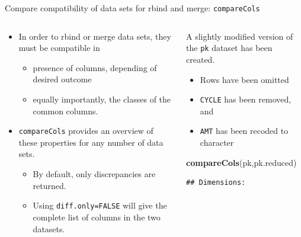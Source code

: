 \documentclass[
  8pt,
  ignorenonframetext,
  aspectratio=169]{beamer}
\newenvironment{Shaded}{\begin{snugshade}}{\end{snugshade}}
\newcommand{\KeywordTok}[1]{\textcolor[rgb]{0.13,0.29,0.53}{\textbf{#1}}}
\newcommand{\NormalTok}[1]{#1}
\providecommand{\tightlist}{%
  \setlength{\itemsep}{0pt}\setlength{\parskip}{0pt}}
\begin{document}
\begin{frame}[fragile]{Compare compatibility of data sets for rbind and
merge: \texttt{compareCols}}
\protect\hypertarget{compare-compatibility-of-data-sets-for-rbind-and-merge-comparecols}{}
\begin{columns}[T]
\begin{column}{0.48\textwidth}
\begin{itemize}
\tightlist
\item
  In order to rbind or merge data sets, they must be compatible in

  \begin{itemize}
  \tightlist
  \item
    presence of columns, depending of desired outcome
  \item
    equally importantly, the classes of the common columns.
  \end{itemize}
\item
  \texttt{compareCols} provides an overview of these properties for any
  number of data sets.

  \begin{itemize}
  \tightlist
  \item
    By default, only discrepancies are returned.
  \item
    Using \texttt{diff.only=FALSE} will give the complete list of
    columns in the two datasets.
  \end{itemize}
\end{itemize}
\end{column}

\begin{column}{0.48\textwidth}
A slightly modified version of the \texttt{pk} dataset has been created.

\begin{itemize}
\tightlist
\item
  Rows have been omitted
\item
  \texttt{CYCLE} has been removed, and
\item
  \texttt{AMT} has been recoded to character
\end{itemize}

\begin{Shaded}
\begin{Highlighting}[]
\KeywordTok{compareCols}\NormalTok{(pk,pk.reduced)}
\end{Highlighting}
\end{Shaded}

\begin{verbatim}
## Dimensions:
\end{verbatim}


\end{column}
\end{columns}
\end{frame}
\end{document}
